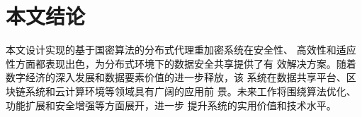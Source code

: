 \section{本文结论}
本文设计实现的基于国密算法的分布式代理重加密系统在安全性、
高效性和适应性方面都表现出色，为分布式环境下的数据安全共享提供了有
效解决方案。随着数字经济的深入发展和数据要素价值的进一步释放，该
系统在数据共享平台、区块链系统和云计算环境等领域具有广阔的应用前
景。未来工作将围绕算法优化、功能扩展和安全增强等方面展开，进一步
提升系统的实用价值和技术水平。







